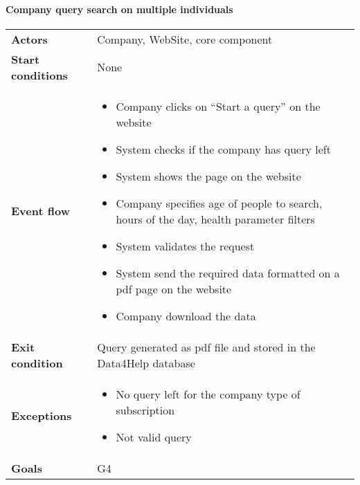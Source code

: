 \paragraph{Company query search on multiple individuals}
\begin{center}
\begin{table}[H]
\centering
\begin{tabular}{l|l}
\textbf{Actors} &
Company, WebSite, core component
 \\
\textbf{Start conditions} & None \\
\textbf{Event flow}  &  \begin{minipage}[t]{0.7\textwidth}
    \begin{itemize}
        \item Company clicks on “Start a query” on the website


        \item System checks if the company has query left

        \item System shows the page on the website
        \item Company specifies age of people to search, hours of the day, health parameter filters
 
        \item System validates the request
        \item System send the required data formatted on a pdf page on the website
        \item Company download the data

    \end{itemize}
    
\end{minipage} \\
\textbf{Exit condition} & Query generated as pdf file and stored in the Data4Help database \\
\textbf{Exceptions} & \begin{minipage}[t]{0.7\textwidth}
    \begin{itemize}
        \item No query left for the company type of subscription
        \item Not valid query
    \end{itemize}
    
\end{minipage} \\
\textbf{Goals} & G4
\end{tabular}

\end{table}
\end{center}











